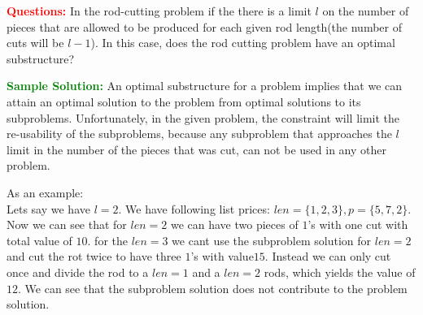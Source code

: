 \problem

\textcolor{Red}{\textbf{Questions:}}
In the rod-cutting problem if the there is a limit $l$ on the number of pieces that are allowed to be produced for each given rod length(the number of cuts will be $l-1$). In this case, does the rod cutting problem have an optimal substructure?

\textcolor{Green}{\textbf{Sample Solution:}}
An optimal substructure for a problem implies that we can attain an optimal solution to the problem from optimal solutions to its subproblems. Unfortunately, in the given problem, the constraint will limit the re-usability of the subproblems, because any subproblem that approaches the $l$ limit in the number of the pieces that was cut, can not be used in any other problem.

As an example:\\
Lets say we have $l = 2$. We have following list prices: $len = \{1,2,3\}, p =\{5,7,2\}$. Now we can see that for $len = 2$ we can have two pieces of $1$'s with one cut with total value of $10$. for the $len=3$ we cant use the subproblem solution for $len=2$ and cut the rot twice to have three $1$'s with value$15$. Instead we can only cut once and divide the rod to a $len=1$ and a $len=2$ rods, which yields the value of $12$. We can see that the subproblem solution does not contribute to the problem solution.

